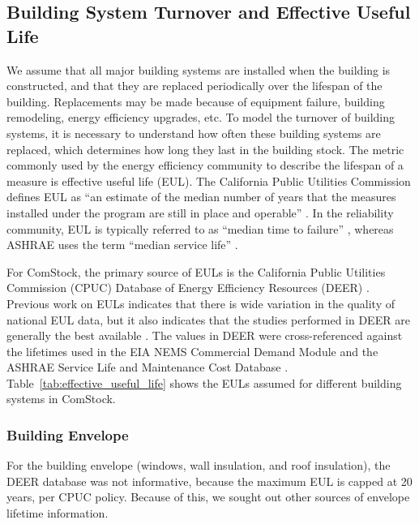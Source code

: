 \subsection{Building System Turnover and Effective Useful Life} %
\label{sec:system_turnover_and_eul}

We assume that all major building systems are installed when the building is constructed, and that they are replaced periodically over the lifespan of the building. Replacements may be made because of equipment failure, building remodeling, energy efficiency upgrades, etc. To model the turnover of building systems, it is necessary to understand how often these building systems are replaced, which determines how long they last in the building stock. The metric commonly used by the energy efficiency community to describe the lifespan of a measure is effective useful life (EUL). The California Public Utilities Commission defines EUL as ``an estimate of the median number of years that the measures installed under the program are still in place and operable'' \citep{cpuc_ee_manual}. In the reliability community, EUL is typically referred to as ``median time to failure'' \citep{ti_reliability_website}, whereas ASHRAE uses the term ``median service life'' \citep{ashrae_reliability_db_article}.

\par
For ComStock, the primary source of EULs is the California Public Utilities Commission (CPUC) Database of Energy Efficiency Resources (DEER) \citep{cpuc_deer}. Previous work on EULs indicates that there is wide variation in the quality of national EUL data, but it also indicates that the studies performed in DEER are generally the best available \citep{what_makes_good_eul}. The values in DEER were cross-referenced against the lifetimes used in the EIA NEMS Commercial Demand Module \citep{nems_com_demand_module} and the ASHRAE Service Life and Maintenance Cost Database \citep{ashrae_reliability_db}. Table~\ref{tab:effective_useful_life} shows the EULs assumed for different building systems in ComStock.



\subsubsection{Building Envelope}
For the building envelope (windows, wall insulation, and roof insulation), the DEER database was not informative, because the maximum EUL is capped at 20 years, per CPUC policy. Because of this, we sought out other sources of envelope lifetime information.

